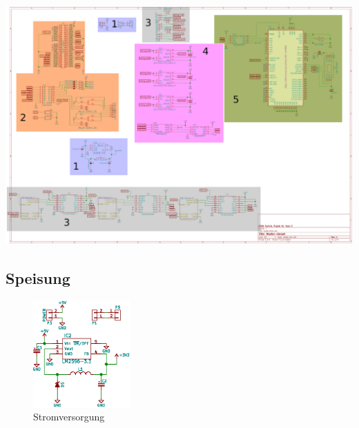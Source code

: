 {\begin{a3pages}
{\begin{minipage}{195mm}
        \centering
        \includegraphics[width=\textwidth]{images/superv-sch/supervisor--sch--highlights.eps}%
        \label{fig:master:schema:highlights}

    \end{minipage}}
\end{a3pages}}


\subsection{Speisung}
\label{subsec:hw:master:supply}

\begin{figure}[h!t]
    \centering
    \includegraphics[width=0.33\textwidth]{images/superv-sch/supervisor--sch--supply.eps}
    \caption{Stromversorgung \Master}
    \label{fig:sch:master:supply}
\end{figure}

